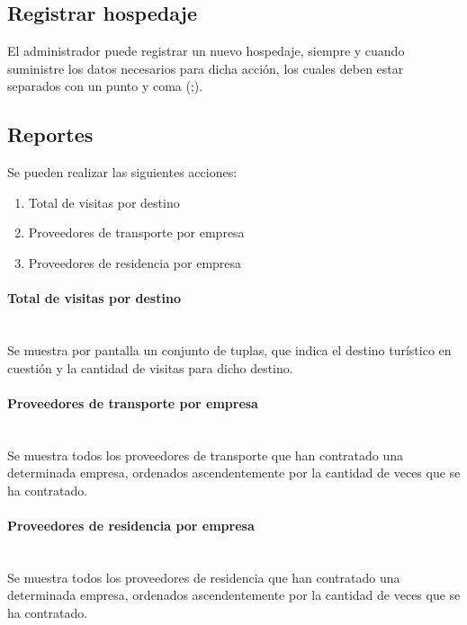 \documentclass{article}
\begin{document}
\subsection{Registrar hospedaje}
El administrador puede registrar un nuevo hospedaje, siempre y cuando suministre los datos necesarios para dicha acción, los cuales deben estar separados con un punto y coma (;).

\subsection{Reportes}
Se pueden realizar las siguientes acciones:
\begin{enumerate}
    \item Total de visitas por destino
    \item Proveedores de transporte por empresa
    \item Proveedores de residencia por empresa
\end{enumerate}
\paragraph{Total de visitas por destino}\mbox{}\\
Se muestra por pantalla un conjunto de tuplas, que indica el destino turístico en cuestión y la cantidad de visitas para dicho destino.

\paragraph{Proveedores de transporte por empresa}\mbox{}\\
Se muestra todos los proveedores de transporte que han contratado una determinada empresa, ordenados ascendentemente por la cantidad de veces que se ha contratado.

\paragraph{Proveedores de residencia por empresa}\mbox{}\\
Se muestra todos los proveedores de residencia que han contratado una determinada empresa, ordenados ascendentemente por la cantidad de veces que se ha contratado.
\end{document}

